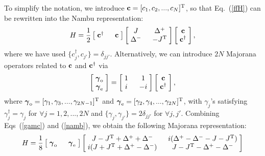 \documentclass{tADP2e}
\theoremstyle{plain}
\theoremstyle{plain}
\theoremstyle{definition}
\begin{document}
\begin{appendices}
To simplify the notation, we introduce $\bold{c}=[c_1,c_2,...,c_N]^{\rm T}$, so that Eq.~(\ref{ffH}) can be rewritten into the Nambu representation:
\begin{equation}
H=\frac{1}{2}\begin{bmatrix} \;\bold{c}^\dag\; & \;\bold{c}\; \end{bmatrix} 
\begin{bmatrix} \;J\; & \;\Delta^+\; \\ \;\Delta^-\; & \;-J^{\rm T}\; \end{bmatrix}
\begin{bmatrix} \;\bold{c}\; \\ \;\bold{c}^\dag\; \end{bmatrix},
\label{namb}
\end{equation}
where we have used $\{c_j^\dag,c_{j'}\}=\delta_{jj'}$. Alternatively, we can introduce $2N$ Majorana operators related to $\bold{c}$ and $\bold{c}^\dag$ via 
\begin{equation}
\begin{bmatrix} \;\boldsymbol{\gamma}_{\rm o}\; \\ \;\boldsymbol{\gamma}_{\rm e}\; \end{bmatrix} = 
\begin{bmatrix} \;1\; & \;1\; \\ \;i\; & \;-i\; \end{bmatrix}
\begin{bmatrix} \;\bold{c}\; \\ \;\bold{c}^\dag\; \end{bmatrix},
\label{gamc}
\end{equation}
where $\boldsymbol{\gamma}_{\rm o}=[\gamma_1,\gamma_3,...,\gamma_{2N-1}]^{\rm T}$ and $\boldsymbol{\gamma}_{\rm e}=[\gamma_2,\gamma_4,...,\gamma_{2N}]^{\rm T}$, with $\gamma_j$'s satisfying $\gamma_j^\dag=\gamma_j$ for $\forall j=1,2,...,2N$ and $\{\gamma_j,\gamma_{j'}\}=2\delta_{jj'}$ for $\forall j,j'$. Combining Eqs~(\ref{gamc}) and (\ref{namb}), we obtain the following Majorana representation:
\begin{equation}
H=\frac{1}{8}\begin{bmatrix} \;\boldsymbol{\gamma}_{\rm o}\; & \;\boldsymbol{\gamma}_{\rm e}\; \end{bmatrix} 
\begin{bmatrix} \;J-J^{\rm T}+\Delta^++\Delta^-\; & \;i(\Delta^+-\Delta^--J-J^{\rm T})\; \\ \;i(J+J^{\rm T}+\Delta^+-\Delta^-)\; & \;J-J^{\rm T}-\Delta^+-\Delta^-\; \end{bmatrix}

\end{equation}
\end{appendices}
\end{document}
